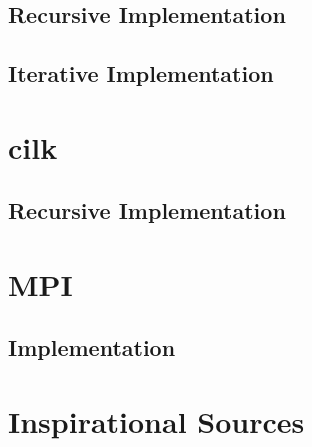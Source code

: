 \documentclass[12pt,a4paper,titlepage,oneside]{scrartcl}
\begin{document}
	\subsection{Recursive Implementation}
	
	\subsection{Iterative Implementation}
	
	
\section{cilk}
	\subsection{Recursive Implementation}
	

\section{MPI}
	\subsection{Implementation}
	
\pagebreak
\section{Inspirational Sources}
	 
%
%
\end{document}
